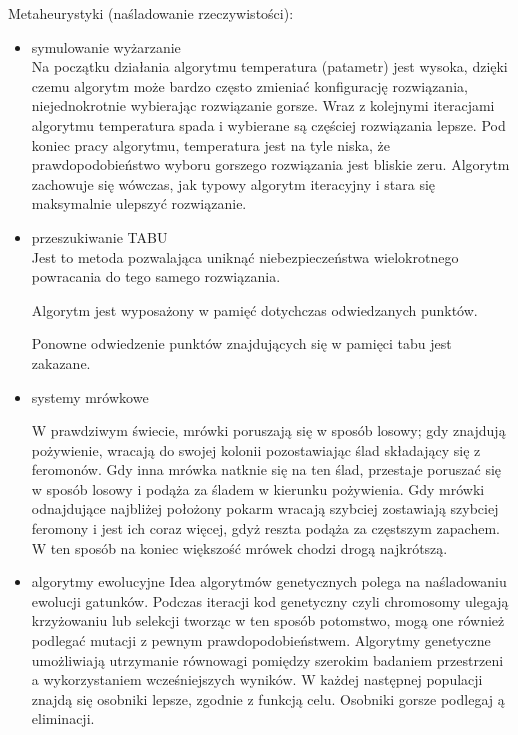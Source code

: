 \documentclass[a4paper,twoside]{report}
\begin{document}
		Metaheurystyki (naśladowanie rzeczywistości):\\
		\begin{itemize}
			\item symulowanie wyżarzanie \\
			Na początku działania algorytmu temperatura (patametr) jest wysoka, dzięki czemu
			algorytm może bardzo często zmieniać konfigurację rozwiązania,
			niejednokrotnie wybierając rozwiązanie gorsze. Wraz z kolejnymi
			iteracjami algorytmu temperatura spada i wybierane są częściej
			rozwiązania lepsze. Pod koniec pracy algorytmu, temperatura jest na tyle
			niska, że prawdopodobieństwo wyboru gorszego rozwiązania jest bliskie
			zeru. Algorytm zachowuje się wówczas, jak typowy algorytm iteracyjny i
			stara się maksymalnie ulepszyć rozwiązanie.
			
			\item przeszukiwanie TABU\\
			Jest to metoda pozwalająca uniknąć niebezpieczeństwa
			wielokrotnego powracania do tego samego rozwiązania.
			
			Algorytm jest wyposażony w pamięć dotychczas odwiedzanych 
			punktów.
			
			Ponowne odwiedzenie punktów znajdujących się w pamięci tabu 
			jest zakazane.
			\item systemy mrówkowe
			
			W prawdziwym  świecie, mrówki poruszają się w sposób losowy; gdy znajdują pożywienie,  wracają do swojej kolonii pozostawiając ślad składający się z feromonów. Gdy inna mrówka  natknie  się na ten ślad, przestaje  poruszać się w sposób losowy i  podąża za śladem w  kierunku pożywienia. Gdy mrówki odnajdujące najbliżej położony pokarm wracają szybciej  zostawiają szybciej  feromony  i  jest  ich  coraz  więcej, gdyż reszta podąża za częstszym  zapachem. W ten sposób na koniec większość mrówek chodzi drogą najkrótszą.  
			
			\item algorytmy ewolucyjne
			Idea algorytmów genetycznych polega na naśladowaniu ewolucji gatunków. Podczas iteracji  kod genetyczny czyli chromosomy ulegają krzyżowaniu lub selekcji tworząc w ten sposób  potomstwo, mogą one również podlegać mutacji z pewnym prawdopodobieństwem.  Algorytmy genetyczne umożliwiają utrzymanie równowagi pomiędzy szerokim badaniem  przestrzeni a wykorzystaniem wcześniejszych wyników. W każdej następnej populacji znajdą  się osobniki lepsze, zgodnie z funkcją celu. Osobniki gorsze podlegaj ą eliminacji.
			

\end{itemize}
\end{document}

